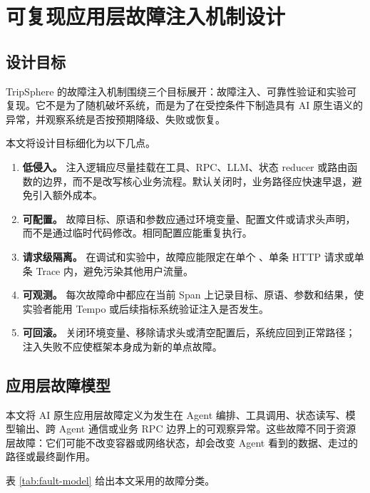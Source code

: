 \chapter{可复现应用层故障注入机制设计}

\section{设计目标}

TripSphere 的故障注入机制围绕三个目标展开：故障注入、可靠性验证和实验可复现。它不是为了随机破坏系统，而是为了在受控条件下制造具有 AI 原生语义的异常，并观察系统是否按预期降级、失败或恢复。

本文将设计目标细化为以下几点。

\begin{enumerate}[label=(\arabic*)]
  \item \textbf{低侵入。} 注入逻辑应尽量挂载在工具、RPC、LLM、状态 reducer 或路由函数的边界，而不是改写核心业务流程。默认关闭时，业务路径应快速早退，避免引入额外成本。
  \item \textbf{可配置。} 故障目标、原语和参数应通过环境变量、配置文件或请求头声明，而不是通过临时代码修改。相同配置应能重复执行。
  \item \textbf{请求级隔离。} 在调试和实验中，故障应能限定在单个 、单条 HTTP 请求或单条 Trace 内，避免污染其他用户流量。
  \item \textbf{可观测。} 每次故障命中都应在当前 Span 上记录目标、原语、参数和结果，使实验者能用 Tempo 或后续指标系统验证注入是否发生。
  \item \textbf{可回滚。} 关闭环境变量、移除请求头或清空配置后，系统应回到正常路径；注入失败不应使框架本身成为新的单点故障。
\end{enumerate}

\section{应用层故障模型}

本文将 AI 原生应用层故障定义为发生在 Agent 编排、工具调用、状态读写、模型输出、跨 Agent 通信或业务 RPC 边界上的可观察异常。这些故障不同于资源层故障：它们可能不改变容器或网络状态，却会改变 Agent 看到的数据、走过的路径或最终副作用。

表 \ref{tab:fault-model} 给出本文采用的故障分类。

